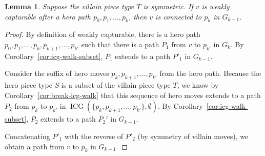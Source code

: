 \documentclass[11pt,letterpaper]{article}
\newcommand{\ICG}{\operatorname{ICG}}
\theoremstyle{plain}
\newtheorem{lemma}[theorem]{Lemma}
\theoremstyle{definition}
\theoremstyle{remark}
\numberwithin{equation}{section}
\begin{document}
\begin{lemma}
  \label{lem:weak-connected}
  Suppose the villain piece type \(T\) is symmetric.
  If \(v\) is weakly capturable after a hero path $p_0, p_1, \ldots, p_k$,
  then \(v\) is connected to \(p_k\) in \(G_{k-1}\).
\end{lemma}
\begin{proof}
  By definition of weakly capturable, there is a hero path
  \(p_0, p_1, \ldots, p_k, p_{k+1}, \ldots, p_{k'}\) such that
  there is a path \(P_1\) from \(v\) to \(p_{k'}\) in \(G_k\).
  By Corollary~\ref{cor:icg-walk-subset},
  \(P_1\) extends to a path \(P'_1\) in \(G_{k-1}\).

  Consider the suffix of hero moves \(p_k, p_{k+1}, \ldots, p_{k'}\)
  from the hero path.
  Because the hero piece type \(S\)
  is a subset of the villain piece type \(T\),
  we know by Corollary~\ref{cor:break-icg-walk} that
  this sequence of hero moves extends to a path \(P_2\) from \(p_k\) to \(p_{k'}\)
  in \(\ICG(\{p_k, p_{k+1}, \ldots, p_{k'}\}, \emptyset)\).
  By Corollary~\ref{cor:icg-walk-subset}, \(P_2\) extends to a path \(P_2'\) in \(G_{k-1}\).

  Concatenating \(P'_1\) with the reverse of \(P'_2\)
  (by symmetry of villain moves),
  we obtain a path from \(v\) to \(p_k\) in \(G_{k-1}\).
\end{proof}
\end{document}
